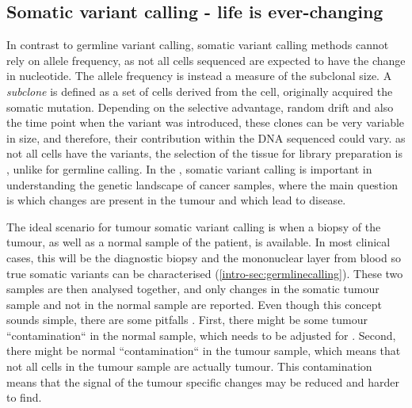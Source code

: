 \subsection[Somatic]{Somatic variant calling - life is ever-changing}
\label{intro-sec:somaticcalling}
In contrast to germline variant calling, somatic variant calling methods cannot rely on allele frequency, as not all cells sequenced are expected to have the  change in nucleotide. The allele frequency is instead a measure of the subclonal size. A \textit{subclone} is defined as a set of cells derived from the cell,  originally acquired the somatic mutation. Depending on the selective advantage, random drift and also the time point when the variant was introduced, these clones can be very variable in size, and therefore, their contribution within the DNA sequenced could vary.
 as not all cells have the variants, the selection of the tissue for library preparation is , unlike for germline calling. 
In the , somatic variant calling is important in understanding the genetic landscape of cancer samples, where the main question is which changes are present in the tumour and which lead to disease.

The ideal scenario for tumour somatic variant calling is when a biopsy of the tumour, as well as a normal sample of the patient, is available. In most clinical cases, this will be the diagnostic biopsy and the mononuclear layer from blood\remove{,} so  true somatic variants can be characterised (\autoref{intro-sec:germlinecalling}). 
These two samples are then analysed together, and only changes in the somatic tumour sample and not in the normal sample are reported. Even though this concept sounds simple, there are some pitfalls \cite{GATKTeam2021a}. First, there might be some tumour ``contamination`` in the normal sample, which needs to be adjusted for \cite{Kim2018,TaylorWeiner2018}. Second, there might be normal ``contamination`` in the tumour sample, which means that not all cells in the tumour sample are actually tumour. This contamination means that the signal of the tumour specific changes may be reduced and harder to find.

